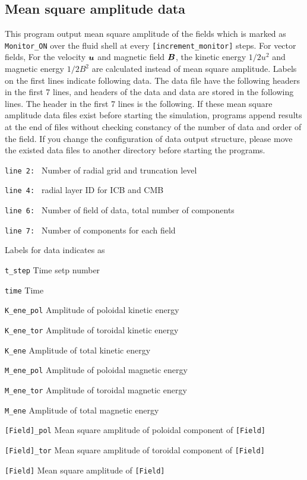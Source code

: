 \subsection{Mean square amplitude data}
This program output mean square amplitude of the fields which is marked as \verb|Monitor_ON| over the fluid shell at every \verb|[increment_monitor]| steps. For vector fields, For the velocity $\mbox{\boldmath$u$}$ and magnetic field $\mbox{\boldmath$B$}$, the kinetic energy $1/2 u^{2}$ and magnetic energy $1/2 B^{2}$ are calculated instead of mean square amplitude. Labels on the first lines indicate following data. The data file have the following headers in the first 7 lines, and headers of the data and data are stored in the following lines. The header in the first 7 lines is the following. If these mean square amplitude data files exist before starting the simulation, programs append results at the end of files without checking constancy of the number of data and order of the field. If you change the configuration of data output structure, please move the existed data files to another directory before starting the programs.
%
\begin{description}
\item{\tt  line 2: } Number of radial grid and truncation level
\item{\tt  line 4: } radial layer ID for ICB and CMB
\item{\tt  line 6: } Number of field of data, total number of components
\item{\tt  line 7: } Number of components for each field
\end{description}
%
Labels for data indicates as
%
\begin{description}
\item{\tt  t\_step}  Time setp number
\item{\tt  time}   Time
\item{\tt  K\_ene\_pol}  Amplitude of poloidal kinetic energy
\item{\tt  K\_ene\_tor}  Amplitude of toroidal kinetic energy
\item{\tt  K\_ene}       Amplitude of total kinetic energy
\item{\tt  M\_ene\_pol}  Amplitude of poloidal magnetic energy
\item{\tt  M\_ene\_tor}  Amplitude of toroidal magnetic energy
\item{\tt  M\_ene}       Amplitude of total magnetic energy
\item{\tt  [Field]\_pol} Mean square amplitude of poloidal component of {\tt [Field]}
\item{\tt  [Field]\_tor} Mean square amplitude of toroidal component of {\tt [Field]}
\item{\tt  [Field]}      Mean square amplitude of {\tt [Field]}
\end{description}
%
